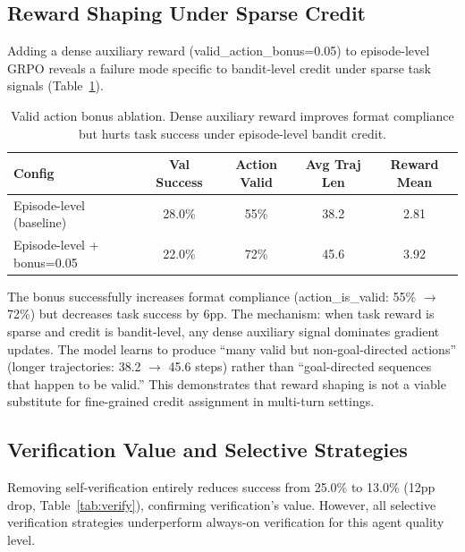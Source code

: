 \documentclass{article}
\begin{document}
\subsection{Reward Shaping Under Sparse Credit}

Adding a dense auxiliary reward (valid\_action\_bonus=0.05) to episode-level GRPO reveals a failure mode specific to bandit-level credit under sparse task signals (Table~\ref{tab:bonus}).

\begin{table}[h]
\centering
\caption{Valid action bonus ablation. Dense auxiliary reward improves format compliance but hurts task success under episode-level bandit credit.}
\label{tab:bonus}
\begin{tabular}{lcccc}
\toprule
Config & Val Success & Action Valid & Avg Traj Len & Reward Mean \\
\midrule
Episode-level (baseline) & 28.0\% & 55\% & 38.2 & 2.81 \\
Episode-level + bonus=0.05 & 22.0\% & 72\% & 45.6 & 3.92 \\
\bottomrule
\end{tabular}
\end{table}

The bonus successfully increases format compliance (action\_is\_valid: 55\% $\to$ 72\%) but decreases task success by 6pp. The mechanism: when task reward is sparse and credit is bandit-level, any dense auxiliary signal dominates gradient updates. The model learns to produce ``many valid but non-goal-directed actions'' (longer trajectories: 38.2 $\to$ 45.6 steps) rather than ``goal-directed sequences that happen to be valid.'' This demonstrates that reward shaping is not a viable substitute for fine-grained credit assignment in multi-turn settings.

\subsection{Verification Value and Selective Strategies}

Removing self-verification entirely reduces success from 25.0\% to 13.0\% (12pp drop, Table~\ref{tab:verify}), confirming verification's value. However, all selective verification strategies underperform always-on verification for this agent quality level.
\end{document}

